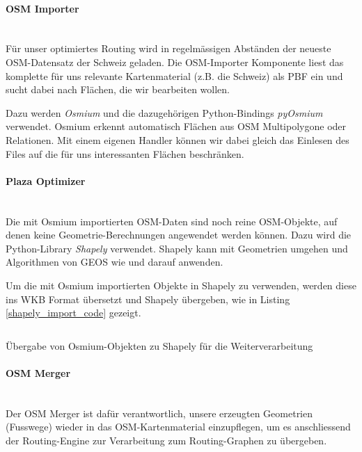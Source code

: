 \paragraph{OSM Importer}\label{par:OSM Importer}~\\
Für unser optimiertes Routing wird in regelmässigen Abständen der neueste \ac{OSM}-Datensatz \cite{osm_data_switzerland} der Schweiz geladen. Die \acs{OSM}-Importer Komponente liest das komplette für uns relevante Kartenmaterial (z.B. die Schweiz) als \ac{PBF} ein und sucht dabei nach Flächen, die wir bearbeiten wollen.

Dazu werden \emph{Osmium} und die dazugehörigen Python-Bindings \emph{pyOsmium}\cite{pyosmium} verwendet. Osmium erkennt automatisch Flächen aus \ac{OSM} Multipolygone oder Relationen. Mit einem eigenen Handler können wir dabei gleich das Einlesen des Files auf die für uns interessanten Flächen beschränken.

\paragraph{Plaza Optimizer}\label{par:Plaza Optimizer}~\\
Die mit Osmium importierten \ac{OSM}-Daten sind noch reine \ac{OSM}-Objekte, auf denen keine Geometrie-Berechnungen angewendet werden können. Dazu wird die Python-Library \emph{Shapely}\cite{shapely} verwendet. Shapely kann mit Geometrien umgehen und Algorithmen von \ac{GEOS} wie  und  darauf anwenden.

Um die mit Osmium importierten Objekte in Shapely zu verwenden, werden diese ins \ac{WKB} Format übersetzt und Shapely übergeben, wie in Listing \ref{shapely_import_code} gezeigt.

\begin{listing}[ht]
    \inputminted{python}{projectdoc/listing/shapely_import.py}
    \caption[Einlesen OSM Objekte in Shapely]{Übergabe von Osmium-Objekten zu Shapely für die Weiterverarbeitung}
    \label{shapely_import_code}
\end{listing}



\paragraph{OSM Merger}\label{par:OSM Merger}~\\
Der OSM Merger ist dafür verantwortlich, unsere erzeugten Geometrien (Fusswege) wieder in das \ac{OSM}-Kartenmaterial einzupflegen, um es anschliessend der Routing-Engine zur Verarbeitung zum Routing-Graphen zu übergeben.

